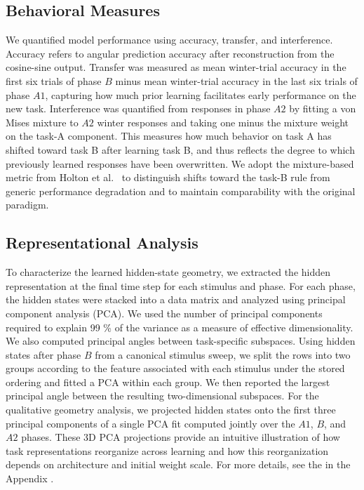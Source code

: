 \documentclass{article}
\theoremstyle{plain}
\theoremstyle{definition}
\theoremstyle{remark}
\begin{document}
        \subsection{Behavioral Measures}

        We quantified model performance using accuracy, transfer, and interference. Accuracy refers to angular prediction accuracy after reconstruction from the cosine-sine output. Transfer was measured as mean winter-trial accuracy in the first six trials of phase \(B\) minus mean winter-trial accuracy in the last six trials of phase \(A1\), capturing how much prior learning facilitates early performance on the new task. Interference was quantified from responses in phase \(A2\) by fitting a von Mises mixture to $A2$ winter responses and taking one minus the mixture weight on the task-A component. This measures how much behavior on task A has shifted toward task B after learning task B, and thus reflects the degree to which previously learned responses have been overwritten. We adopt the mixture-based metric from Holton et al.~\cite{holton2025humans} to distinguish shifts toward the task-B rule from generic performance degradation and to maintain comparability with the original paradigm. 
        
        \subsection{Representational Analysis}
        
        To characterize the learned hidden-state geometry, we extracted the hidden representation at the final time step for each stimulus and phase. For each phase, the hidden states were stacked into a data matrix and analyzed using principal component analysis (PCA). We used the number of principal components required to explain 99 \% of the variance as a measure of effective dimensionality. We also computed principal angles between task-specific subspaces. Using hidden states after phase \(B\) from a canonical stimulus sweep, we split the rows into two groups according to the feature associated with each stimulus under the stored ordering and fitted a PCA within each group. We then reported the largest principal angle between the resulting two-dimensional subspaces. For the qualitative geometry analysis, we projected hidden states onto the first three principal components of a single PCA fit computed jointly over the \(A1\), \(B\), and \(A2\) phases. These 3D PCA projections provide an intuitive illustration of how task representations reorganize across learning and how this reorganization depends on architecture and initial weight scale. For more details, see the  in the Appendix .
\end{document}

